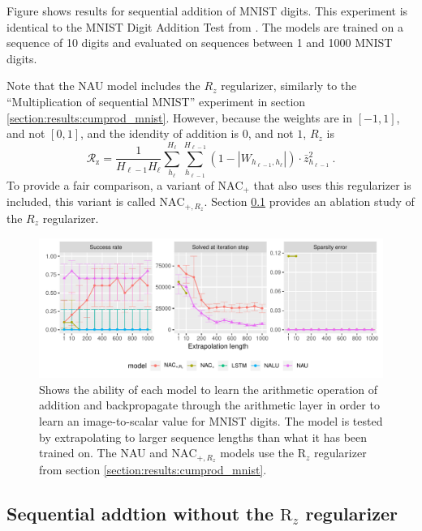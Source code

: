 Figure \label{fig:sequential-mnist-sum} shows results for sequential addition of MNIST digits. This experiment is identical to the MNIST Digit Addition Test from \citet[section 4.2]{trask-nalu}. The models are trained on a sequence of 10 digits and evaluated on sequences between 1 and 1000 MNIST digits.

Note that the NAU model includes the $R_z$ regularizer, similarly to the ``Multiplication of sequential MNIST'' experiment in section \ref{section:results:cumprod_mnist}. However, because the weights are in $[-1, 1]$, and not $[0,1]$, and the idendity of addition is $0$, and not $1$, $R_z$ is 
\begin{equation}
    \mathcal{R}_{\mathrm{z}} = \frac{1}{H_{\ell-1} H_\ell} \sum_{h_\ell}^{H_\ell} \sum_{h_{\ell-1}}^{H_{\ell-1}} (1 - |W_{h_{\ell-1},h_\ell}|) \cdot \bar{z}_{h_{\ell-1}}^2\ .
\end{equation}
To provide a fair comparison, a variant of $\mathrm{NAC}_{+}$ that also uses this regularizer is included, this variant is called $\mathrm{NAC}_{+, R_z}$. Section \ref{sec:appendix:sequential-mnist-sum:ablation} provides an ablation study of the $R_z$ regularizer.

\begin{figure}[H]
\centering
\includegraphics[width=\linewidth,trim={0 0.5cm 0 0},clip]{paper/results/sequential_mnist_sum_long.pdf}
\caption{Shows the ability of each model to learn the arithmetic operation of addition and backpropagate through the arithmetic layer in order to learn an image-to-scalar value for MNIST digits. The model is tested by extrapolating to larger sequence lengths than what it has been trained on. The NAU and $\mathrm{NAC}_{+,R_z}$ models use the $\mathrm{R}_z$ regularizer from section \ref{section:results:cumprod_mnist}.}
\label{fig:sequential-mnist-sum}
\end{figure}

\subsection{Sequential addtion without the \texorpdfstring{$\mathrm{R}_z$}{R\_z} regularizer}
\label{sec:appendix:sequential-mnist-sum:ablation}

